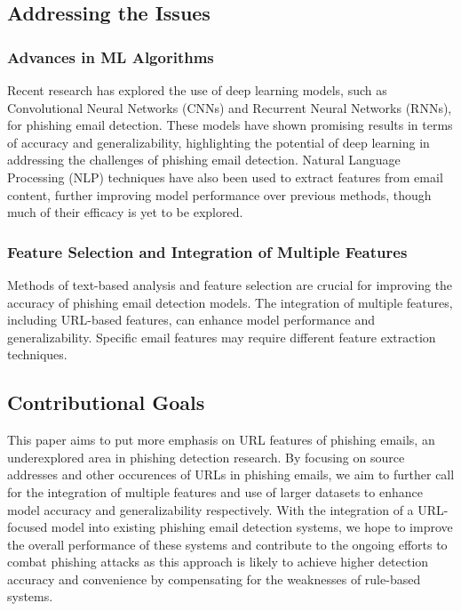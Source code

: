 \subsection{Addressing the Issues}
\subsubsection{Advances in ML Algorithms}
Recent research has explored the use of deep learning models, such as Convolutional Neural Networks (CNNs) and Recurrent Neural Networks (RNNs), for phishing email detection. These models have shown promising results in terms of accuracy and generalizability, highlighting the potential of deep learning in addressing the challenges of phishing email detection. Natural Language Processing (NLP) techniques have also been used to extract features from email content, further improving model performance over previous methods, though much of their efficacy is yet to be explored. \cite{salloum2022}\cite{dada2019}\cite{atlam2022}\cite{vazhayil2018}
\subsubsection{Feature Selection and Integration of Multiple Features}
Methods of text-based analysis and feature selection are crucial for improving the accuracy of phishing email detection models. The integration of multiple features, including URL-based features, can enhance model performance and generalizability. Specific email features may require different feature extraction techniques. \cite{salloum2022}\cite{dada2019}\cite{vazhayil2018}

\subsection{Contributional Goals}
This paper aims to put more emphasis on URL features of phishing emails, an underexplored area in phishing detection research. By focusing on source addresses and other occurences of URLs in phishing emails, we aim to further call for the integration of multiple features and use of larger datasets to enhance model accuracy and generalizability respectively. With the integration of a URL-focused model into existing phishing email detection systems, we hope to improve the overall performance of these systems and contribute to the ongoing efforts to combat phishing attacks as this approach is likely to achieve higher detection accuracy and convenience by compensating for the weaknesses of rule-based systems.

